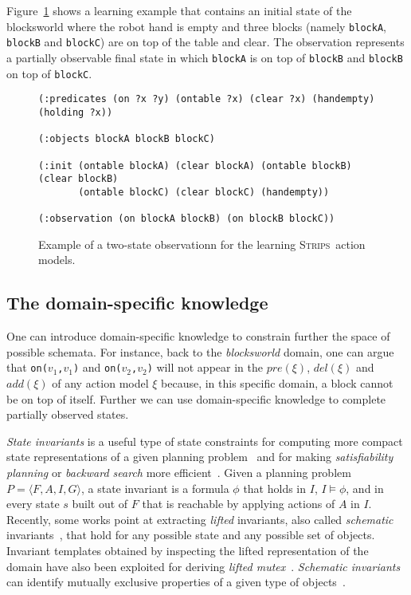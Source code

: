 \documentclass[runningheads]{llncs}
\newcommand{\tup}[1]{{\langle #1 \rangle}}
\newcommand{\strips}{\textsc{Strips}}     %
\begin{document}
Figure~\ref{fig:observation} shows a learning example that contains an initial state of the blocksworld where the robot hand is empty and three blocks (namely {\small\tt blockA}, {\small\tt blockB} and {\small\tt blockC}) are on top of the table and clear. The observation represents a partially observable final state in which {\tt\small{blockA}} is on top of {\tt\small{blockB}} and {\tt\small{blockB}} on top of {\tt\small{blockC}}.

\begin{figure}[hbt!]
  \begin{small}
  \begin{verbatim}
(:predicates (on ?x ?y) (ontable ?x) (clear ?x) (handempty) (holding ?x))

(:objects blockA blockB blockC)

(:init (ontable blockA) (clear blockA) (ontable blockB) (clear blockB)
       (ontable blockC) (clear blockC) (handempty))

(:observation (on blockA blockB) (on blockB blockC))
  \end{verbatim}
  \end{small}
	\caption{\small Example of a two-state observationn for the learning \strips\ action models.}
	\label{fig:observation}
\end{figure}


\subsection{The domain-specific knowledge}
One can introduce domain-specific knowledge to constrain further the space of possible schemata. For instance, back to the {\em blocksworld} domain, one can argue that {\small\tt on($v_1$,$v_1$)} and {\small\tt on($v_2$,$v_2$)} will not appear in the $pre(\xi)$, $del(\xi)$ and $add(\xi)$ of any action model $\xi$ because, in this specific domain, a block cannot be on top of itself. Further we can use domain-specific knowledge to complete partially observed states.

{\em State invariants} is a useful type of state constraints for computing more compact state representations of a given planning problem~\cite{helmert2009concise} and for making {\em satisfiability planning} or {\em backward search} more efficient~\cite{rintanen2014madagascar,alcazar2015reminder}. Given a planning problem $P=\tup{F,A,I,G}$, a state invariant is a formula $\phi$ that holds in $I$, $I\models \phi$, and in every state $s$ built out of $F$ that is reachable by applying actions of $A$ in $I$. Recently, some works point at extracting \emph{lifted} invariants, also called {\em schematic} invariants~\cite{rintanen:schematicInvariants:AAAI2017}, that hold for any possible state and any possible set of objects. Invariant templates obtained by inspecting the lifted representation of the domain have also been exploited for deriving \emph{lifted mutex}~\cite{BernardiniFS18}. {\em Schematic invariants} can identify mutually exclusive properties of a given type of objects~\cite{fox:TIM:JAIR1998}. 
\end{document}
